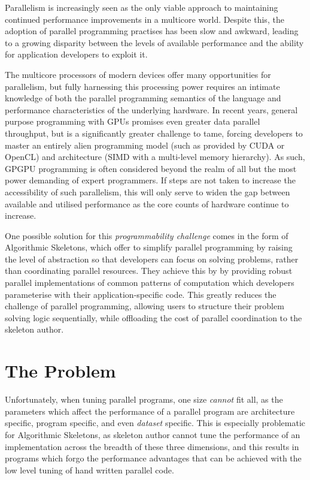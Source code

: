Parallelism is increasingly seen as the only viable approach to
maintaining continued performance improvements in a multicore world.
Despite this, the adoption of parallel programming practises has been
slow and awkward, leading to a growing disparity between the levels of
available performance and the ability for application developers to
exploit it.

The multicore processors of modern devices offer many opportunities
for parallelism, but fully harnessing this processing power requires
an intimate knowledge of both the parallel programming semantics of
the language and performance characteristics of the underlying
hardware. In recent years, general purpose programming with GPUs
promises even greater data parallel throughput, but is a significantly
greater challenge to tame, forcing developers to master an entirely
alien programming model (such as provided by CUDA or OpenCL) and
architecture (SIMD with a multi-level memory hierarchy). As such,
GPGPU programming is often considered beyond the realm of all but the
most power demanding of expert programmers. If steps are not taken to
increase the accessibility of such parallelism, this will only serve
to widen the gap between available and utilised performance as the
core counts of hardware continue to increase.

One possible solution for this \emph{programmability challenge} comes
in the form of Algorithmic Skeletons, which offer to simplify parallel
programming by raising the level of abstraction so that developers can
focus on solving problems, rather than coordinating parallel
resources. They achieve this by by providing robust parallel
implementations of common patterns of computation which developers
parameterise with their application-specific code. This greatly
reduces the challenge of parallel programming, allowing users to
structure their problem solving logic sequentially, while offloading
the cost of parallel coordination to the skeleton author.


\section{The Problem}

Unfortunately, when tuning parallel programs, one size \emph{cannot}
fit all, as the parameters which affect the performance of a parallel
program are architecture specific, program specific, and even
\emph{dataset} specific. This is especially problematic for
Algorithmic Skeletons, as skeleton author cannot tune the performance
of an implementation across the breadth of these three dimensions, and
this results in programs which forgo the performance advantages that
can be achieved with the low level tuning of hand written parallel
code.



